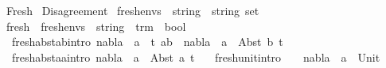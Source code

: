 %
\begin{isabellebody}%
%
%
\isadelimtheory
%
\endisadelimtheory
%
\isatagtheory
{}\isamarkupfalse%
\ Fresh\isanewline
\isanewline
{}\ Disagreement\isanewline
\isanewline
{}%
\endisatagtheory
{\isafoldtheory}%
%
\isadelimtheory
\isanewline
%
\endisadelimtheory
\isanewline
{}\isamarkupfalse%
\ fresh{\isacharunderscore}{\kern0pt}envs\ {\isacharequal}{\kern0pt}\ {\isachardoublequoteopen}{\isacharparenleft}{\kern0pt}string\ {\isasymtimes}\ string{\isacharparenright}{\kern0pt}\ set{\isachardoublequoteclose}\isanewline
\isanewline
{}\isamarkupfalse%
\ fresh\ {\isacharcolon}{\kern0pt}{\isacharcolon}{\kern0pt}\ {\isachardoublequoteopen}fresh{\isacharunderscore}{\kern0pt}envs\ {\isasymRightarrow}\ string\ {\isasymRightarrow}\ trm\ {\isasymRightarrow}\ bool{\isachardoublequoteclose}\ {\isacharparenleft}{\kern0pt}{\isachardoublequoteopen}\ {\isacharunderscore}{\kern0pt}\ {\isasymturnstile}\ {\isacharunderscore}{\kern0pt}\ {\isasymsharp}\ {\isacharunderscore}{\kern0pt}{\isachardoublequoteclose}\ {\isacharbrackleft}{\kern0pt}{}{}{\isacharcomma}{\kern0pt}{}{}{\isacharcomma}{\kern0pt}{}{}{\isacharbrackright}{\kern0pt}\ {}{}{\isacharparenright}{\kern0pt}\ \isanewline
\ \ \isanewline
\ \ fresh{\isacharunderscore}{\kern0pt}abst{\isacharunderscore}{\kern0pt}ab{\isacharbrackleft}{\kern0pt}intro{\isacharbang}{\kern0pt}{\isacharbrackright}{\kern0pt}{\isacharcolon}{\kern0pt}\ {\isachardoublequoteopen}{\isasymlbrakk}nabla\ {\isasymturnstile}\ a\ {\isasymsharp}\ t{\isacharsemicolon}{\kern0pt}\ a{\isasymnoteq}b{\isasymrbrakk}\ {\isasymLongrightarrow}\ nabla\ {\isasymturnstile}\ a\ {\isasymsharp}\ Abst\ b\ t{\isachardoublequoteclose}\ {\isacharbar}{\kern0pt}\isanewline
\ \ fresh{\isacharunderscore}{\kern0pt}abst{\isacharunderscore}{\kern0pt}aa{\isacharbrackleft}{\kern0pt}intro{\isacharbang}{\kern0pt}{\isacharbrackright}{\kern0pt}{\isacharcolon}{\kern0pt}\ {\isachardoublequoteopen}nabla\ {\isasymturnstile}\ a\ {\isasymsharp}\ Abst\ a\ t{\isachardoublequoteclose}\ {\isacharbar}{\kern0pt}\isanewline
\ \ fresh{\isacharunderscore}{\kern0pt}unit{\isacharbrackleft}{\kern0pt}intro{\isacharbang}{\kern0pt}{\isacharbrackright}{\kern0pt}{\isacharcolon}{\kern0pt}\ \ \ \ {\isachardoublequoteopen}nabla\ {\isasymturnstile}\ a\ {\isasymsharp}\ Unit{\isachardoublequoteclose}\ {\isacharbar}{\kern0pt}\isanewline

\end{isabellebody}
